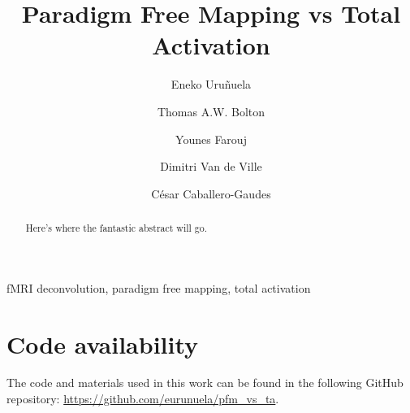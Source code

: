 \documentclass[5p]{elsarticle}
\begin{document}
\begin{frontmatter}

\title{Paradigm Free Mapping vs Total Activation}

\author[bcbl,upv]{Eneko Uru\~nuela}

\author[japan]{Thomas A.W. Bolton}
\author[epfl]{Younes Farouj}
\author[epfl,unige]{Dimitri Van de Ville}
\author[bcbl]{C\'{e}sar Caballero-Gaudes}

\address[bcbl]{Basque Center on Cognition, Brain and Language (BCBL), Donostia-San Sebasti\'{a}n, Spain.}
\address[upv]{University of the Basque Country, Donostia-San Sebasti\'{a}n, Spain.}
\address[japan]{Department of Decoded Neurofeedback, ATR Computational Neuroscience Laboratories, Kyoto, Japan}
\address[epfl]{Swiss Federal Institute of Technology Lausanne (EPFL), Lausanne, Switzerland.}
\address[unige]{Faculty of Medicine of the University of Geneva, Geneva, Switzerland}

\begin{abstract}
Here's where the fantastic abstract will go.
\end{abstract}

\begin{keyword}
fMRI deconvolution, paradigm free mapping, total activation
\end{keyword}

\end{frontmatter}

\linenumbers









\section{Code availability}

The code and materials used in this work can be found in the following GitHub repository: \url{https://github.com/eurunuela/pfm_vs_ta}.


\end{document}
